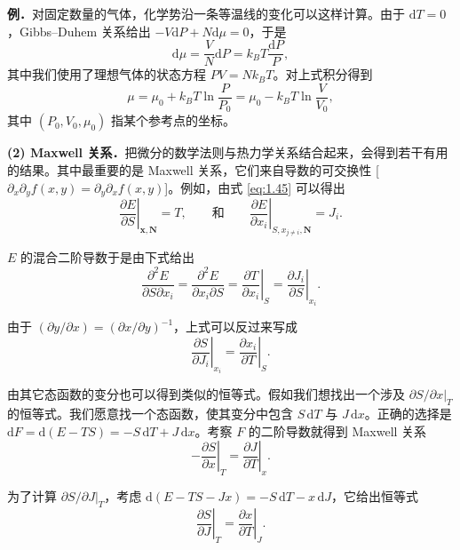 \textbf{例．}\quad 对固定数量的气体，化学势沿一条等温线的变化可以这样计算。由于 $\mathrm{d}T=0$，Gibbs--Duhem 关系给出 $-V\mathrm{d}P+N\mathrm{d}\mu=0$，于是
\begin{equation}
\mathrm{d}\mu=\frac{V}{N}\mathrm{d}P=k_BT\frac{\mathrm{d}P}{P},
\label{eq:1.50}
\end{equation}
其中我们使用了理想气体的状态方程 $PV=Nk_BT$。对上式积分得到
\begin{equation}
\mu=\mu_0+k_BT\ln\frac{P}{P_0}=\mu_0-k_BT\ln\frac{V}{V_0},
\label{eq:1.51}
\end{equation}
其中 $(P_0,V_0,\mu_0)$ 指某个参考点的坐标。

\textbf{(2) Maxwell 关系．}\quad 把微分的数学法则与热力学关系结合起来，会得到若干有用的结果。其中最重要的是 Maxwell 关系，它们来自导数的可交换性 [$\partial_x\partial_y f(x,y)=\partial_y\partial_x f(x,y)$]。例如，由式 \eqref{eq:1.45} 可以得出
\begin{equation}
\left.\frac{\partial E}{\partial S}\right|_{\bm{x},\bm{N}}=T,\qquad\text{和}\qquad\left.\frac{\partial E}{\partial x_i}\right|_{S,x_{j\neq i},\bm{N}}=J_i.
\label{eq:1.52}
\end{equation}

$E$ 的混合二阶导数于是由下式给出
\begin{equation}
\frac{\partial^2E}{\partial S\partial x_i}=\frac{\partial^2E}{\partial x_i\partial S}=\left.\frac{\partial T}{\partial x_i}\right|_S=\left.\frac{\partial J_i}{\partial S}\right|_{x_i}.
\label{eq:1.53}
\end{equation}

由于 $(\partial y/\partial x)=(\partial x/\partial y)^{-1}$，上式可以反过来写成
\begin{equation}
\left.\frac{\partial S}{\partial J_i}\right|_{x_i}=\left.\frac{\partial x_i}{\partial T}\right|_S.
\label{eq:1.54}
\end{equation}

由其它态函数的变分也可以得到类似的恒等式。假如我们想找出一个涉及 $\left.\partial S/\partial x\right|_T$ 的恒等式。我们愿意找一个态函数，使其变分中包含 $S\,\mathrm{d}T$ 与 $J\,\mathrm{d}x$。正确的选择是 $\mathrm{d}F=\mathrm{d}(E-TS)=-S\,\mathrm{d}T+J\,\mathrm{d}x$。考察 $F$ 的二阶导数就得到 Maxwell 关系
\begin{equation}
-\left.\frac{\partial S}{\partial x}\right|_T=\left.\frac{\partial J}{\partial T}\right|_x.
\label{eq:1.55}
\end{equation}

为了计算 $\left.\partial S/\partial J\right|_T$，考虑 $\mathrm{d}(E-TS-Jx)=-S\,\mathrm{d}T-x\,\mathrm{d}J$，它给出恒等式
\begin{equation}
\left.\frac{\partial S}{\partial J}\right|_T=\left.\frac{\partial x}{\partial T}\right|_J.
\label{eq:1.56}
\end{equation}

